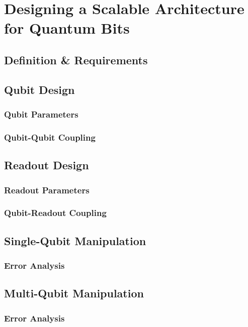\chapter{Designing a Scalable Architecture for Quantum Bits}

\section{Definition \& Requirements}

\section{Qubit Design}

\subsection{Qubit Parameters}

\subsection{Qubit-Qubit Coupling}

\section{Readout Design}

\subsection{Readout Parameters}

\subsection{Qubit-Readout Coupling}

\section{Single-Qubit Manipulation}

\subsection{Error Analysis}

\section{Multi-Qubit Manipulation}

\subsection{Error Analysis}

